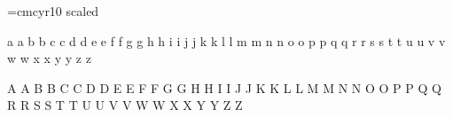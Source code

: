 
\font\mediumcy=cmcyr10 scaled \magstephalf






\rm
\noindent
a {\mediumcy a}\hfil\break
b {\mediumcy b}\hfil\break
c {\mediumcy c}\hfil\break
d {\mediumcy d}\hfil\break
e {\mediumcy e}\hfil\break
f {\mediumcy f}\hfil\break
g {\mediumcy g}\hfil\break
h {\mediumcy h}\hfil\break
i {\mediumcy i}\hfil\break
j {\mediumcy j}\hfil\break
k {\mediumcy k}\hfil\break
l {\mediumcy l}\hfil\break
m {\mediumcy m}\hfil\break
n {\mediumcy n}\hfil\break
o {\mediumcy o}\hfil\break
p {\mediumcy p}\hfil\break
q {\mediumcy q}\hfil\break
r {\mediumcy r}\hfil\break
s {\mediumcy s}\hfil\break
t {\mediumcy t}\hfil\break
u {\mediumcy u}\hfil\break
v {\mediumcy v}\hfil\break
w {\mediumcy w}\hfil\break
x {\mediumcy x}\hfil\break
y {\mediumcy y}\hfil\break
z {\mediumcy z}\hfil\break

\noindent
A {\mediumcy A}\hfil\break
B {\mediumcy B}\hfil\break
C {\mediumcy C}\hfil\break
D {\mediumcy D}\hfil\break
E {\mediumcy E}\hfil\break
F {\mediumcy F}\hfil\break
G {\mediumcy G}\hfil\break
H {\mediumcy H}\hfil\break
I {\mediumcy I}\hfil\break
J {\mediumcy J}\hfil\break
K {\mediumcy K}\hfil\break
L {\mediumcy L}\hfil\break
M {\mediumcy M}\hfil\break
N {\mediumcy N}\hfil\break
O {\mediumcy O}\hfil\break
P {\mediumcy P}\hfil\break
Q {\mediumcy Q}\hfil\break
R {\mediumcy R}\hfil\break
S {\mediumcy S}\hfil\break
T {\mediumcy T}\hfil\break
U {\mediumcy U}\hfil\break
V {\mediumcy V}\hfil\break
W {\mediumcy W}\hfil\break
X {\mediumcy X}\hfil\break
Y {\mediumcy Y}\hfil\break
Z {\mediumcy Z}\hfil\break

\bye

